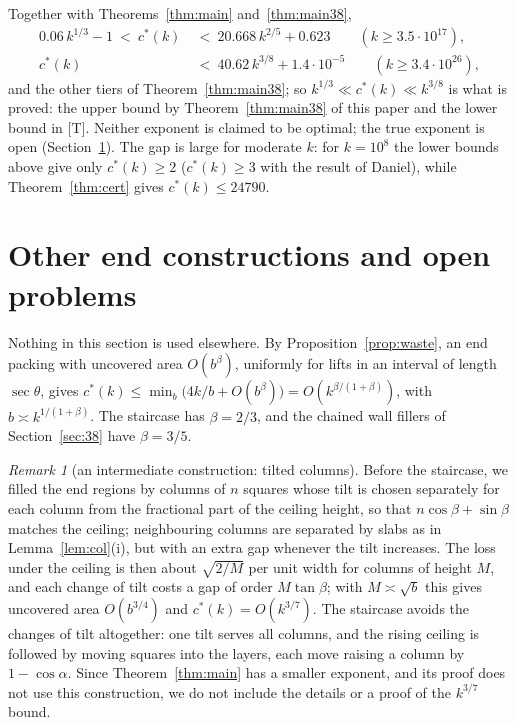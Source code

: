 \documentclass[11pt]{amsart}
\newcommand{\cs}{c^{*}}
\theoremstyle{definition}
\theoremstyle{remark}
\newtheorem{remark}[theorem]{Remark}
\numberwithin{equation}{section}
\begin{document}
Together with Theorems~\ref{thm:main} and~\ref{thm:main38},
\begin{align*}
0.06\,k^{1/3}-1\ <\ \cs(k)\ &<\ 20.668\,k^{2/5}+0.623\qquad(k\ge3.5\cdot10^{17}),\\
\cs(k)\ &<\ 40.62\,k^{3/8}+1.4\cdot10^{-5}\qquad(k\ge3.4\cdot10^{26}),
\end{align*}
and the other tiers of Theorem~\ref{thm:main38}; so $k^{1/3}\ll\cs(k)\ll k^{3/8}$ is what is proved: the upper bound by Theorem~\ref{thm:main38} of this paper and the
lower bound in [T]. Neither exponent is claimed to be optimal; the true exponent is open
(Section~\ref{sec:open}). The gap is large for moderate $k$: for $k=10^8$ the lower bounds above give only
$\cs(k)\ge2$ ($\cs(k)\ge3$ with the result of Daniel), while Theorem~\ref{thm:cert} gives $\cs(k)\le24790$.

\section{Other end constructions and open problems}\label{sec:open}

Nothing in this section is used elsewhere. By Proposition~\ref{prop:waste}, an end packing with uncovered area
$O(b^{\beta})$, uniformly for lifts in an interval of length $\sec\theta$, gives
$\cs(k)\le\min_b\bigl(4k/b+O(b^{\beta})\bigr)=O(k^{\beta/(1+\beta)})$, with $b\asymp k^{1/(1+\beta)}$. The staircase
has $\beta=2/3$, and the chained wall fillers of Section~\ref{sec:38} have $\beta=3/5$.

\begin{remark}[an intermediate construction: tilted columns]\label{rem:37}
Before the staircase, we filled the end regions by columns of $n$ squares whose tilt is chosen separately for each
column from the fractional part of the ceiling height, so that $n\cos\beta+\sin\beta$ matches the ceiling; neighbouring
columns are separated by slabs as in Lemma~\ref{lem:col}(i), but with an extra gap whenever the tilt increases. The
loss under the ceiling is then about $\sqrt{2/M}$ per unit width for columns of height $M$, and each change of tilt
costs a gap of order $M\tan\beta$; with $M\asymp\sqrt b$ this gives uncovered area $O(b^{3/4})$ and $\cs(k)=O(k^{3/7})$.
The staircase avoids the changes of tilt altogether: one tilt serves all columns, and the rising ceiling is followed
by moving squares into the layers, each move raising a column by $1-\cos\alpha$. Since Theorem~\ref{thm:main} has a smaller
exponent, and its proof does not use this construction, we do not include the details or a proof of the $k^{3/7}$
bound.
\end{remark}
\end{document}
